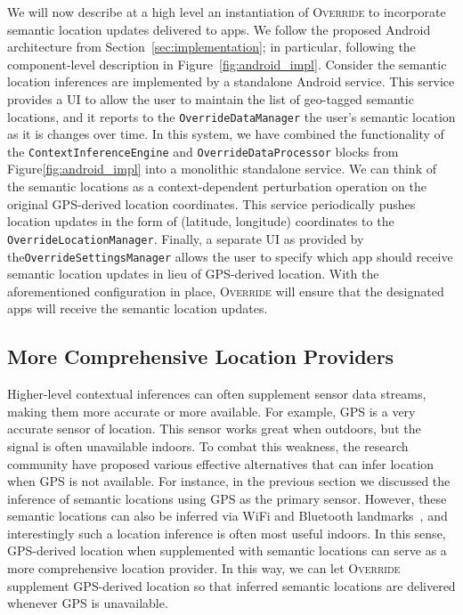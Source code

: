 \documentclass[10pt]{sensys-proc}
\begin{document}
We will now describe at a high level an instantiation of \textsc{Override} to incorporate semantic location updates delivered to apps. We follow the proposed Android architecture from Section~\ref{sec:implementation}; in particular, following the component-level description in Figure~\ref{fig:android_impl}. Consider the semantic location inferences are implemented by a standalone Android service. This service provides a UI to allow the user to maintain the list of geo-tagged semantic locations, and it reports to the \texttt{OverrideDataManager} the user's semantic location as it is changes over time. In this system, we have combined the functionality of the \texttt{ContextInferenceEngine} and \texttt{OverrideDataProcessor} blocks from Figure\ref{fig:android_impl} into a monolithic standalone service. We can think of the semantic locations as a context-dependent perturbation operation on the original GPS-derived location coordinates. This service periodically pushes location updates in the form of (latitude, longitude) coordinates to the \texttt{OverrideLocationManager}. Finally, a separate UI as provided by the\texttt{OverrideSettingsManager} allows the user to specify which app should receive semantic location updates in lieu of GPS-derived location. With the aforementioned configuration in place, \textsc{Override} will ensure that the designated apps will receive the semantic location updates.

\subsection{More Comprehensive Location Providers}
Higher-level contextual inferences can often supplement sensor data streams, making them more accurate or more available. For example, GPS is a very accurate sensor of location. This sensor works great when outdoors, but the signal is often unavailable indoors. To combat this weakness, the research community have proposed various effective alternatives that can infer location when GPS is not available. For instance, in the previous section we discussed the inference of semantic locations using GPS as the primary sensor. However, these semantic locations can also be inferred  via WiFi and Bluetooth landmarks~\cite{Kim:PlaceSens,Ananthanarayanan:BlueFi}, and interestingly such a location inference is often most useful indoors. In this sense, GPS-derived location when supplemented with semantic locations can serve as a more comprehensive location provider. In this way, we can let \textsc{Override} supplement GPS-derived location so that inferred semantic locations are delivered whenever GPS is unavailable.
\end{document}
